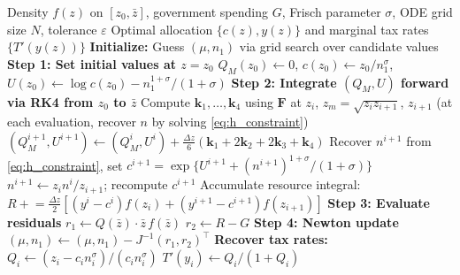 \documentclass[12pt,a4paper]{article}
\theoremstyle{definition}
\theoremstyle{plain}
\theoremstyle{remark}
\newcommand{\zbar}{\bar{z}}
\newcommand{\zlow}{z_{\scriptscriptstyle 0}}
\begin{document}
\begin{algorithm}[H]
\caption{Differential Equations (Shooting) Approach}\label{alg:ode}
\begin{algorithmic}[1]
\Require Density $f(z)$ on $[\zlow, \zbar]$, government spending $G$, Frisch parameter $\sigma$, ODE grid size $N$, tolerance $\varepsilon$
\Ensure Optimal allocation $\{c(z), y(z)\}$ and marginal tax rates $\{T'(y(z))\}$
\Statex
\State \textbf{Initialize:} Guess $(\mu, n_1)$ via grid search over candidate values
\Statex
\Repeat
  \State \textbf{Step 1: Set initial values at $z = \zlow$}
  \Statex \hspace{\algorithmicindent}\hspace{\algorithmicindent} $Q_M(\zlow) \gets 0$, \quad $c(\zlow) \gets \zlow / n_1^{\sigma}$, \quad $U(\zlow) \gets \log c(\zlow) - n_1^{1+\sigma}/(1+\sigma)$
  \Statex
  \State \textbf{Step 2: Integrate $(Q_M, U)$ forward via RK4 from $\zlow$ to $\zbar$}
    \State Compute $\mathbf{k}_1, \ldots, \mathbf{k}_4$ using $\mathbf{F}$ at $z_i$, $z_m = \sqrt{z_i z_{i+1}}$, $z_{i+1}$
    \Statex \hspace{\algorithmicindent}\hspace{\algorithmicindent}\hspace{\algorithmicindent} (at each evaluation, recover $n$ by solving \eqref{eq:h_constraint})
    \State $(Q_M^{i+1}, U^{i+1}) \gets (Q_M^i, U^i) + \frac{\Delta z}{6}(\mathbf{k}_1 + 2\mathbf{k}_2 + 2\mathbf{k}_3 + \mathbf{k}_4)$
    \State Recover $n^{i+1}$ from \eqref{eq:h_constraint}, set $c^{i+1} = \exp\{U^{i+1} + (n^{i+1})^{1+\sigma}/(1+\sigma)\}$
     
      \State $n^{i+1} \gets z_i n^i / z_{i+1}$; recompute $c^{i+1}$ 
    \EndIf
    \State Accumulate resource integral: $R \mathrel{+}= \frac{\Delta z}{2}[(y^i - c^i)f(z_i) + (y^{i+1} - c^{i+1})f(z_{i+1})]$
  \EndFor
  \Statex
  \State \textbf{Step 3: Evaluate residuals}
  \Statex \hspace{\algorithmicindent}\hspace{\algorithmicindent} $r_1 \gets Q(\zbar) \cdot \zbar \, f(\zbar)$ 
  \Statex \hspace{\algorithmicindent}\hspace{\algorithmicindent} $r_2 \gets R - G$ 
  \Statex
  \State \textbf{Step 4: Newton update}
  \Statex \hspace{\algorithmicindent}\hspace{\algorithmicindent} $(\mu, n_1) \gets (\mu, n_1) - J^{-1}(r_1, r_2)^\top$ 
\Statex
\State \textbf{Recover tax rates:}
  \State $Q_i \gets (z_i - c_i n_i^{\sigma})/(c_i n_i^{\sigma})$
  \State $T'(y_i) \gets Q_i / (1 + Q_i)$
\EndFor
\end{algorithmic}
\end{algorithm}
\end{document}
